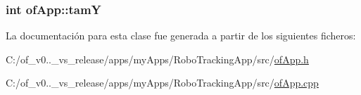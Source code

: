 \subsubsection[{tam\+Y}]{\setlength{\rightskip}{0pt plus 5cm}int of\+App\+::tam\+Y\hspace{0.3cm}{\ttfamily [private]}}\label{classof_app_ac1e9d00b0014a47490688c3b298a67c9}


La documentación para esta clase fue generada a partir de los siguientes ficheros\+:\begin{DoxyCompactItemize}
\item 
C\+:/of\+\_\+v0..\+\_\+vs\+\_\+release/apps/my\+Apps/\+Robo\+Tracking\+App/src/\hyperlink{of_app_8h}{of\+App.\+h}\item 
C\+:/of\+\_\+v0..\+\_\+vs\+\_\+release/apps/my\+Apps/\+Robo\+Tracking\+App/src/\hyperlink{of_app_8cpp}{of\+App.\+cpp}\end{DoxyCompactItemize}

